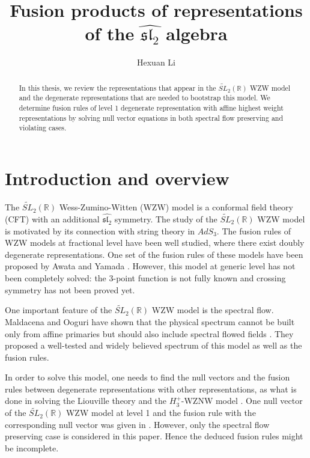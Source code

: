 \documentclass[10pt,a4paper]{article}
\numberwithin{equation}{section}
\begin{document}
\title{Fusion products of representations of the $\widehat{\mathfrak{sl}_{2}}$ algebra}
\author{Hexuan Li}
\maketitle


\begin{abstract}
    In this thesis, we review the representations that appear in the $\widetilde{SL}_{2}(\mathbb{R})$ WZW model and the degenerate representations that are needed 
    to bootstrap this model. 
    We determine fusion rules of level 1 degenerate representation with affine highest weight representations by 
    solving null vector equations in both spectral flow preserving and violating cases. 
\end{abstract}

\tableofcontents

\section{Introduction and overview}
The $\widetilde{SL}_{2}(\mathbb{R})$ Wess-Zumino-Witten (WZW) model is a conformal field theory (CFT) with an additional 
$\widehat{\mathfrak{sl}_{2}}$ symmetry. The study of the $\widetilde{SL}_{2}(\mathbb{R})$ WZW model is motivated by 
its connection with string theory in $AdS_{3}$. The fusion rules of WZW models at fractional level have been well studied, 
where there exist doubly degenerate representations. One set of the fusion rules of these models have been proposed by 
Awata and Yamada \cite{Awata:1992sm}. However, this model at generic level has not been completely solved: the 3-point function is not 
fully known and crossing symmetry has not been proved yet. 

One important feature of the $\widetilde{SL}_{2}(\mathbb{R})$ WZW model is the spectral flow. Maldacena and Ooguri have shown that the 
physical spectrum cannot be built only from affine primaries but should also include spectral flowed fields \cite{Maldacena:2001km}. 
They proposed a well-tested and widely believed spectrum of this model as well as the fusion rules.

In order to solve this model, one needs to find the null vectors and the fusion rules between degenerate representations with other 
representations, as what is done in solving the Liouville theory \cite{Ribault:2014hia} and the $H^{+}_{3}$-WZNW model \cite{Teschner:1997ft}. 
One null vector of the $\widetilde{SL}_{2}(\mathbb{R})$ WZW model at level 1 and the fusion rule with the corresponding null vector 
was given in \cite{Stocco:2022gah}. However, only the spectral flow preserving case is considered in this paper. Hence the deduced 
fusion rules might be incomplete. 
\end{document}
